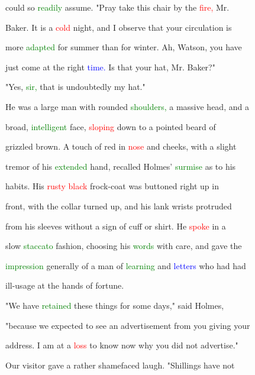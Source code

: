  could so \textcolor{green}{readily} assume. \textcolor{BurntOrange}{"Pray} take this chair by the \textcolor{red}{fire,} Mr.

 Baker. It is a \textcolor{red}{cold} night, and I observe that your circulation is

 more \textcolor{green}{adapted} for summer than for winter. Ah, Watson, you have

 just come at the right \textcolor{blue}{time.} Is that your hat, Mr. Baker?"



 "Yes, \textcolor{green}{sir,} that is undoubtedly my hat."



 He was a large man with rounded \textcolor{green}{shoulders,} a massive head, and a

 broad, \textcolor{green}{intelligent} face, \textcolor{red}{sloping} down to a pointed beard of

 grizzled brown. A touch of red in \textcolor{red}{nose} and cheeks, with a slight

 \textcolor{BurntOrange}{tremor} of his \textcolor{green}{extended} hand, recalled Holmes' \textcolor{green}{surmise} as to his

 habits. His \textcolor{red}{rusty} \textcolor{red}{black} frock-coat was buttoned right up in

 front, with the collar turned up, and his lank wrists protruded

 from his sleeves without a sign of cuff or shirt. He \textcolor{red}{spoke} in a

 slow \textcolor{green}{staccato} fashion, choosing his \textcolor{green}{words} with care, and gave the

 \textcolor{green}{impression} generally of a man of \textcolor{green}{learning} and \textcolor{blue}{letters} who had had

 ill-usage at the hands of \textcolor{BurntOrange}{fortune.}



 "We have \textcolor{green}{retained} these things for some days," said Holmes,

 "because we \textcolor{BurntOrange}{expected} to see an advertisement from you giving your

 address. I am at a \textcolor{red}{loss} to know now why you did not advertise."



 Our \textcolor{BurntOrange}{visitor} gave a rather shamefaced \textcolor{BurntOrange}{laugh.} "Shillings have not

